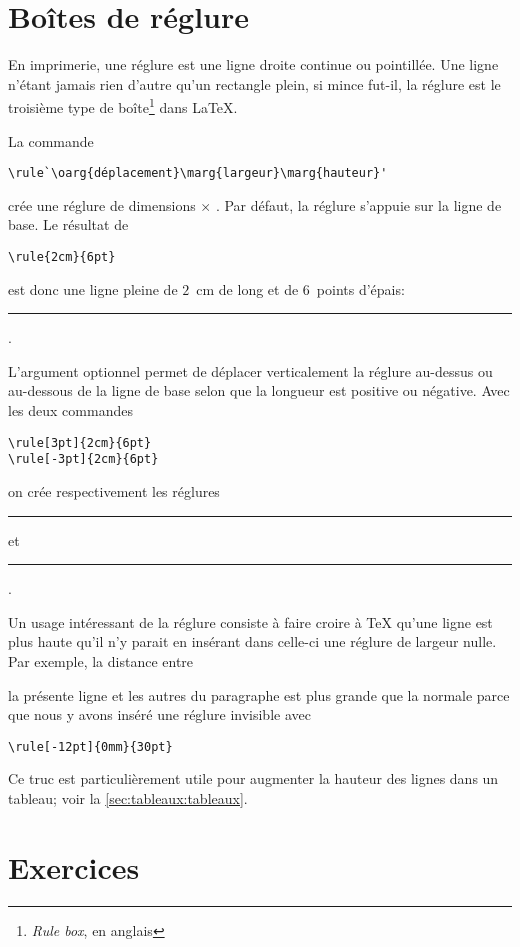 \section{Boîtes de réglure}
\label{sec:boites:rulebox}

En imprimerie, une réglure est une ligne droite continue ou
pointillée. Une ligne n'étant jamais rien d'autre qu'un rectangle
plein, si mince fut-il, la réglure est le troisième type de
boîte\footnote{%
  \emph{Rule box}, en anglais} %
dans {\LaTeX}.

La commande
\begin{lstlisting}
\rule`\oarg{déplacement}\marg{largeur}\marg{hauteur}'
\end{lstlisting}
crée une réglure de dimensions  $\times$ .
Par défaut, la réglure s'appuie sur la ligne de base. Le résultat de
\begin{lstlisting}
\rule{2cm}{6pt}
\end{lstlisting}
est donc une ligne pleine de $2$~cm de long et de $6$~points d'épais:
\rule{2cm}{6pt}.

L'argument optionnel  permet de déplacer
verticalement la réglure au-dessus ou au-dessous de la ligne de base
selon que la longueur  est positive ou négative. Avec les deux
commandes
\begin{lstlisting}
\rule[3pt]{2cm}{6pt}
\rule[-3pt]{2cm}{6pt}
\end{lstlisting}
on crée respectivement les réglures \rule[3pt]{2cm}{6pt} et
\rule[-3pt]{2cm}{6pt}.

Un usage intéressant de la réglure consiste à faire croire à {\TeX}
qu'une ligne est plus haute qu'il n'y parait en insérant dans celle-ci
une réglure de largeur nulle. Par exemple, la distance entre
\rule[-12pt]{0mm}{30pt}\relax la présente ligne et les autres du paragraphe est
plus grande que la normale parce que nous y avons inséré une réglure
invisible avec
\begin{lstlisting}
\rule[-12pt]{0mm}{30pt}
\end{lstlisting}
Ce truc est particulièrement utile pour augmenter la hauteur des
lignes dans un tableau; voir la \autoref{sec:tableaux:tableaux}.




\section{Exercices}
\label{sec:boites:exercices}


